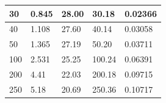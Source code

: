 \documentclass[twocolumn,english]{IEEEtran}
\theoremstyle{plain}
\theoremstyle{plain}
\begin{document}
\begin{table}[htpb]
\begin{tabular}{|l|l|l|l|l|}
30                                                                                               & 0.845                                                                               & 28.00                                                                                & 30.18                                                                                                & 0.02366                              \\ \hline
40                                                                                               & 1.108                                                                               & 27.60                                                                                & 40.14                                                                                                & 0.03058                              \\ \hline
50                                                                                               & 1.365                                                                               & 27.19                                                                                & 50.20                                                                                                & 0.03711                              \\ \hline
100                                                                                              & 2.531                                                                               & 25.25                                                                                & 100.24                                                                                               & 0.06391                              \\ \hline
200                                                                                              & 4.41                                                                                & 22.03                                                                                & 200.18                                                                                               & 0.09715                              \\ \hline
250                                                                                              & 5.18                                                                                & 20.69                                                                                & 250.36                                                                                               & 0.10717                              \\ \hline

\end{tabular}
\end{table}
\end{document}
